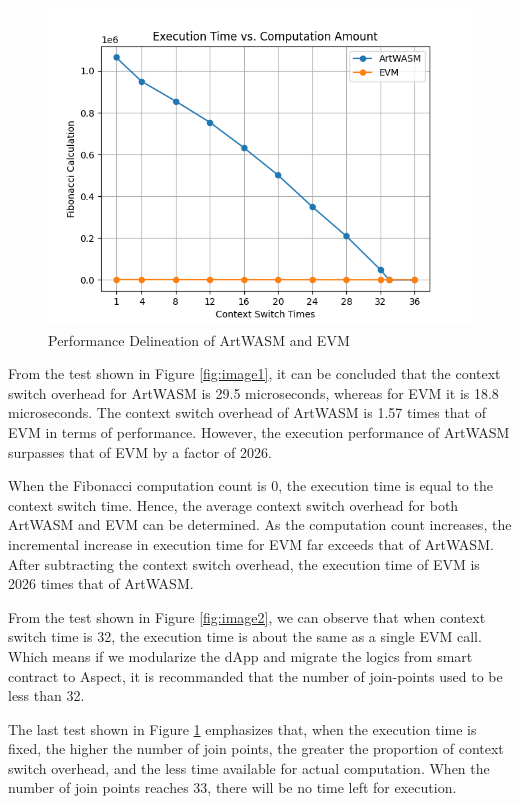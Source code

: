 \begin{figure}[htp]
\begin{minipage}{0.3\textwidth}
    \centering
    \includegraphics[width=1\linewidth]{sections/tx-latency-na-vs-jpc.png}
    \caption{Performance Delineation of ArtWASM and EVM}
    \label{fig:image3}
  \end{minipage}
\end{figure}

From the test shown in Figure \ref{fig:image1}, it can be concluded that the context switch overhead for ArtWASM is 29.5 microseconds, whereas for EVM it is 18.8 microseconds. The context switch overhead of ArtWASM is 1.57 times that of EVM in terms of performance. However, the execution performance of ArtWASM surpasses that of EVM by a factor of 2026.

When the Fibonacci computation count is 0, the execution time is equal to the context switch time. Hence, the average context switch overhead for both ArtWASM and EVM can be determined. As the computation count increases, the incremental increase in execution time for EVM far exceeds that of ArtWASM. After subtracting the context switch overhead, the execution time of EVM is 2026 times that of ArtWASM.

From the test shown in Figure \ref{fig:image2}, we can observe that when context switch time is 32, the execution time is about the same as a single EVM call. Which means if we modularize the dApp and migrate the logics from smart contract to Aspect, it is recommanded that the number of join-points used to be less than 32.

The last test shown in Figure \ref{fig:image3} emphasizes that, when the execution time is fixed, the higher the number of join points, the greater the proportion of context switch overhead, and the less time available for actual computation. When the number of join points reaches 33, there will be no time left for execution.

